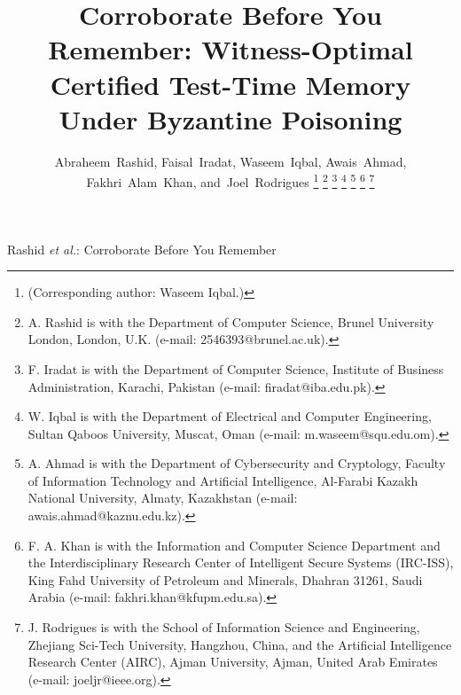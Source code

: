 \documentclass[journal]{IEEEtran}
\theoremstyle{remark}
\begin{document}

\title{Corroborate Before You Remember: Witness-Optimal Certified Test-Time Memory Under Byzantine Poisoning}

\author{Abraheem~Rashid, Faisal~Iradat, Waseem~Iqbal, Awais~Ahmad, Fakhri~Alam~Khan, and~Joel~Rodrigues%
\thanks{(Corresponding author: Waseem Iqbal.)}%
\thanks{A. Rashid is with the Department of Computer Science, Brunel University London, London, U.K. (e-mail: 2546393@brunel.ac.uk).}%
\thanks{F. Iradat is with the Department of Computer Science, Institute of Business Administration, Karachi, Pakistan (e-mail: firadat@iba.edu.pk).}%
\thanks{W. Iqbal is with the Department of Electrical and Computer Engineering, Sultan Qaboos University, Muscat, Oman (e-mail: m.waseem@squ.edu.om).}%
\thanks{A. Ahmad is with the Department of Cybersecurity and Cryptology, Faculty of Information Technology and Artificial Intelligence, Al-Farabi Kazakh National University, Almaty, Kazakhstan (e-mail: awais.ahmad@kaznu.edu.kz).}%
\thanks{F. A. Khan is with the Information and Computer Science Department and the Interdisciplinary Research Center of Intelligent Secure Systems (IRC-ISS), King Fahd University of Petroleum and Minerals, Dhahran 31261, Saudi Arabia (e-mail: fakhri.khan@kfupm.edu.sa).}%
\thanks{J. Rodrigues is with the School of Information Science and Engineering, Zhejiang Sci-Tech University, Hangzhou, China, and the Artificial Intelligence Research Center (AIRC), Ajman University, Ajman, United Arab Emirates (e-mail: joeljr@ieee.org).}}

%
{Rashid \MakeLowercase{\textit{et al.}}: Corroborate Before You Remember}

\maketitle
\end{document}

